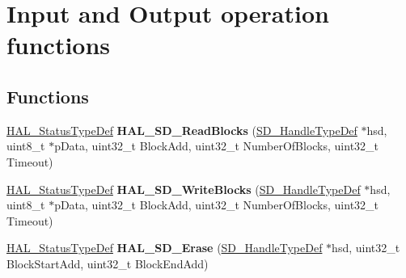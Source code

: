 \hypertarget{group___s_d___exported___functions___group2}{}\section{Input and Output operation functions}
\label{group___s_d___exported___functions___group2}
\subsection*{Functions}
\begin{DoxyCompactItemize}
\item 
\mbox{\label{group___s_d___exported___functions___group2_ga57c9c8243514fc0e9834093b76f299db}} 
\mbox{\hyperlink{stm32f7xx__hal__def_8h_a63c0679d1cb8b8c684fbb0632743478f}{H\+A\+L\+\_\+\+Status\+Type\+Def}} {\bfseries H\+A\+L\+\_\+\+S\+D\+\_\+\+Read\+Blocks} (\mbox{\hyperlink{group___s_d___exported___types___group3_ga1f31eb64a86b0c740bb5c02fa4c9914d}{S\+D\+\_\+\+Handle\+Type\+Def}} $\ast$hsd, uint8\+\_\+t $\ast$p\+Data, uint32\+\_\+t Block\+Add, uint32\+\_\+t Number\+Of\+Blocks, uint32\+\_\+t Timeout)
\item 
\mbox{\label{group___s_d___exported___functions___group2_gab2da788be2f14d72f9cfd4b9a647cf8c}} 
\mbox{\hyperlink{stm32f7xx__hal__def_8h_a63c0679d1cb8b8c684fbb0632743478f}{H\+A\+L\+\_\+\+Status\+Type\+Def}} {\bfseries H\+A\+L\+\_\+\+S\+D\+\_\+\+Write\+Blocks} (\mbox{\hyperlink{group___s_d___exported___types___group3_ga1f31eb64a86b0c740bb5c02fa4c9914d}{S\+D\+\_\+\+Handle\+Type\+Def}} $\ast$hsd, uint8\+\_\+t $\ast$p\+Data, uint32\+\_\+t Block\+Add, uint32\+\_\+t Number\+Of\+Blocks, uint32\+\_\+t Timeout)
\item 
\mbox{\label{group___s_d___exported___functions___group2_gac2173726606e9e3a3ffce50f21fe0c38}} 
\mbox{\hyperlink{stm32f7xx__hal__def_8h_a63c0679d1cb8b8c684fbb0632743478f}{H\+A\+L\+\_\+\+Status\+Type\+Def}} {\bfseries H\+A\+L\+\_\+\+S\+D\+\_\+\+Erase} (\mbox{\hyperlink{group___s_d___exported___types___group3_ga1f31eb64a86b0c740bb5c02fa4c9914d}{S\+D\+\_\+\+Handle\+Type\+Def}} $\ast$hsd, uint32\+\_\+t Block\+Start\+Add, uint32\+\_\+t Block\+End\+Add)
\item 
\mbox{\label{group___s_d___exported___functions___group2_gaabd954880a6d21a0bf9a3c874e0f6a4d}} 

\end{DoxyCompactItemize}
